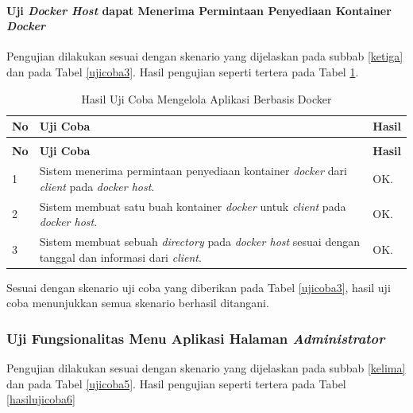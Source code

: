 \paragraph{Uji \textit{Docker Host} dapat Menerima Permintaan Penyediaan Kontainer \textit{Docker}}
Pengujian dilakukan sesuai dengan skenario yang dijelaskan pada subbab \ref{ketiga} dan pada Tabel \ref{ujicoba3}. Hasil pengujian seperti tertera pada Tabel \ref{hasilujicoba3}.

\begin{longtable}{|p{}|p{}|p{}|}					\caption{Hasil Uji Coba \textit{Docker Host} dapat Menerima Permintaan Penyediaan Kontainer \textit{Docker}} \label{hasilujicoba3} \\
	\hline
	\textbf{No} & \textbf{Uji Coba} & \textbf{Hasil} \\ \hline
	\endfirsthead
	\caption[]{Hasil Uji Coba Mengelola Aplikasi Berbasis Docker} \\
	\hline
	\textbf{No} & \textbf{Uji Coba} & \textbf{Hasil} \\ \hline
	\endhead
	\endfoot
	\endlastfoot
	
	1 & Sistem menerima permintaan penyediaan kontainer \textit{docker} dari \textit{client} pada \textit{docker host}. & OK. \\ \hline
	2 & Sistem membuat satu buah kontainer \textit{docker} untuk \textit{client} pada \textit{docker host}. & OK. \\ \hline
	3 & Sistem membuat sebuah \textit{directory} pada \textit{docker host} sesuai dengan tanggal dan informasi dari \textit{client}. & OK. \\ \hline
\end{longtable}
Sesuai dengan skenario uji coba  yang diberikan pada Tabel \ref{ujicoba3}, hasil uji coba menunjukkan semua skenario berhasil ditangani.
        
\subsubsection{Uji Fungsionalitas Menu Aplikasi Halaman \textit{Administrator}}
Pengujian dilakukan sesuai dengan skenario yang dijelaskan pada subbab \ref{kelima} dan pada Tabel \ref{ujicoba5}. Hasil pengujian seperti tertera pada Tabel \ref{hasilujicoba6}

